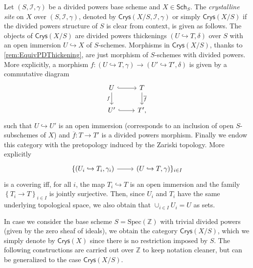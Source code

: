 \begin{defn}
	Let $\left(S, \mathcal{I}, \gamma\right)$ be a divided powers base scheme
	and $X \in \mathsf{Sch}_{ S }$.
	The {\em crystalline site} on $X$ over $\left(S, \mathcal{I}, \gamma\right)$,
	denoted by $\mathsf{Crys}(X/S, \mathcal{I}, \gamma)$ or simply
	$\mathsf{Crys}(X/S)$ if the divided powers structure of $S$ 
	is clear from context, is given as follows.
	The objects of $\mathsf{Crys}(X/S)$ are
	divided powers thickenings $\left(U \hookrightarrow T, \delta\right)$ over $S$
	with an open immersion $U \hookrightarrow X$ of $S$-schemes.
	Morphisms in $\mathsf{Crys}(X/S)$, thanks to \cref{rem:EquivPDThickening},
	are just morphism of $S$-schemes with divided powers.
	More explicitly, a morphism $f\colon \left(U \hookrightarrow T, \gamma\right)
	\to \left(U' \hookrightarrow T', \delta\right)$ is given by a commutative
	diagram
	\begin{equation}\label{diag:MorphDivPowers}
	\begin{tikzcd}
		U \arrow[d, "f"', rightarrow] \arrow[r, "", hookrightarrow] &
		T \arrow[d, "\overline{f}", rightarrow] \\
		U' \arrow[r, "", hookrightarrow] &
		T'
	,\end{tikzcd}
	\end{equation}
	such that $U \hookrightarrow U'$ is an open immersion (corresponds to
	an inclusion of open $S$-subschemes of $X$) and
	$\overline{f}\colon T \to T'$ is a divided powers morphism.
	Finally we endow this category with the pretopology induced by the
	Zariski topology.
	More explicitly 
	\begin{equation*}
	\begin{tikzcd}
		\{ \left(U_i \hookrightarrow T_i, \gamma_i\right)
		\arrow[r, "", rightarrow] &
		\left(U \hookrightarrow T, \gamma\right) \}_{i \in I}
	\end{tikzcd}
	\end{equation*}
	is a covering iff, for all $i$, the map
	$T_i \hookrightarrow T$ is an open immersion and
	the family $\left\{ T_i \to T \right\}_{i \in I}$
	is jointly surjective.
	Then, since $U_i$ and $T_i$ have the same underlying topological space,
	we also obtain that $\cup_{i \in I} U_i = U$ as sets.
\end{defn}


\begin{ntt}[]
	In case we consider the base scheme $S = \mathrm{Spec}(\mathbb{Z})$
	with trivial divided powers (given by the zero sheaf of ideals),
	we obtain the category $\mathsf{Crys}(X/S)$, which
	we simply denote by $\mathsf{Crys}(X)$ since there is no
	restriction imposed by $S$.
	The following constructions are carried out over $\mathbb{Z}$ to
	keep notation cleaner, but can be generalized to the case $\mathsf{Crys}(X/S)$.
\end{ntt}


